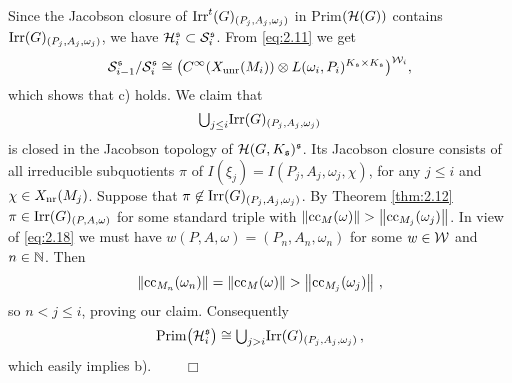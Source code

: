 Since the Jacobson closure of $\mathrm{Irr}^t (G)_{(P_j ,A_j ,\omega_j )}$ in Prim$ (\mathcal H (G))$ 
contains $\mathrm{Irr} (G)_{(P_j ,A_j ,\omega_j )} $, we have
$\mathcal H^{\mathfrak s}_i \subset \mathcal S^{\mathfrak s}_i$. From \eqref{eq:2.11} we get
\begin{equation}\label{eq:2.23}
 \mathcal S_{i-1}^{\mathfrak s} / \mathcal S_i^{\mathfrak s} \cong \big( C^\infty (X_{\mathrm{unr}} (M_i )) \otimes 
L(\omega_i ,P_i )^{K_{\mathfrak s} \times K_{\mathfrak s}} \big)^{\mathcal W_i} ,
\end{equation}
which shows that c) holds. We claim that
\begin{equation*}
{\textstyle\bigcup_{j \leq i} } \mathrm{Irr}(G)_{(P_j ,A_j ,\omega_j )}
\end{equation*}
is closed in the Jacobson topology of $\mathcal H (G, K_{\mathfrak s})^{\mathfrak s}$.
Its Jacobson closure consists of all irreducible subquotients $\pi$ of 
$I(\xi_j ) = I (P_j , A_j ,\omega_j ,\chi )$, for any $j \leq i$ and $\chi \in X_{\mathrm{nr}} (M_j )$.
Suppose that $\pi \not\in \mathrm{Irr}(G)_{(P_j ,A_j ,\omega_j )}$. By Theorem \ref{thm:2.12}
$\pi \in \mathrm{Irr}(G)_{(P ,A ,\omega )}$ for some standard triple with
$\left\| \mathrm{cc}_M (\omega ) \right\| > \left\| \mathrm{cc}_{M_j} (\omega_j ) \right\|$. In view of \eqref{eq:2.18} we must 
have $w(P,A,\omega) = (P_n ,A_n ,\omega_n )$ for some $w \in \mathcal W$ and $n \in \mathbb N$. Then
\[
\left\| \mathrm{cc}_{M_n}(\omega_n ) \right\| = \left\| \mathrm{cc}_M (\omega ) \right\| > \left\| \mathrm{cc}_{M_j} (\omega_j ) \right\| \,,
\]
so $n < j \leq i$, proving our claim. Consequently
\[
\mathrm{Prim} \big( \mathcal H_i^{\mathfrak s} \big) \cong 
{\textstyle\bigcup_{j > i} } \mathrm{Irr}(G)_{(P_j ,A_j ,\omega_j )} \,,
\]
which easily implies b). $\qquad \Box$ 